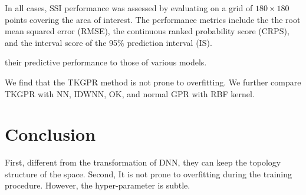 \documentclass[journal, oneside, twocolumn]{IEEEtran}
\begin{document}
In all cases, SSI performance was assessed by evaluating on a grid of $180\times180$ points covering the area of interest. The performance metrics include the the root mean squared error (RMSE), the continuous ranked probability score (CRPS),
and the interval score of the 95\% prediction interval (IS)\cite{Gneiting2007}. 

their predictive performance to those of various models.

We find that the TKGPR method is not prone to overfitting.
We further compare TKGPR with NN, IDWNN, OK, and normal GPR with RBF kernel. 







\section{Conclusion}
First, different from the transformation of DNN, they can keep the topology structure of the space.  Second, It is not prone to overfitting during the training procedure. However, the hyper-parameter is subtle.

\ifCLASSOPTIONcaptionsoff
  \newpage
\fi





\end{document}
